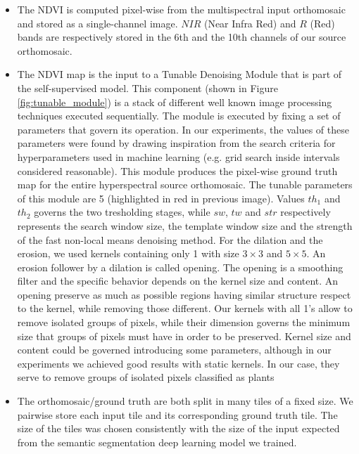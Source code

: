 \documentclass[comsoc,final]{IEEEtran}
\newcommand{\todo}[1]{\textcolor{red}{#1}}
\begin{document}
\begin{itemize}
    \item The NDVI is computed pixel-wise from the multispectral input orthomosaic and stored as a single-channel image. 
    $NIR$ (Near Infra Red) and $R$ (Red) bands are respectively stored in the 6th and the 10th channels of our source orthomosaic.
    \item The NDVI map is the input to a Tunable Denoising Module that is part of the self-supervised model. This component (shown in Figure \ref{fig:tunable_module}) is a stack of different well known image processing techniques executed sequentially. 
    The module is executed by fixing a set of parameters that govern its operation. In our experiments, the values of these parameters were found by drawing inspiration from the search criteria for hyperparameters used in machine learning (e.g. grid search inside intervals considered reasonable).
    This module produces the pixel-wise ground truth map for the entire hyperspectral source orthomosaic. The tunable parameters of this module are 5 (highlighted in red in previous image). Values $th_1$ and $th_2$ governs the two tresholding stages, while $sw$, $tw$ and $str$ respectively represents the search window size, the template window size and the strength of the fast non-local means denoising method. For the dilation and the erosion, we used kernels containing only 1 with size $3\times3$ and $5\times5$.
    An erosion follower by a dilation is called opening. The opening is a smoothing filter and the specific behavior depends on the kernel size and content. An opening preserve as much as possible regions having similar structure respect to the kernel, while removing those different. Our kernels with all 1's allow to remove isolated groups of pixels, while their dimension governs the minimum size that groups of pixels must have in order to be preserved. Kernel size and content could be governed introducing some parameters, although in our experiments we achieved good results with static kernels.
In our case, they serve to remove groups of isolated pixels classified as plants 
    \item The orthomosaic/ground truth are both split in many tiles of a fixed size. We pairwise store each input tile and its corresponding ground truth tile. The size of the tiles was chosen consistently with the size of the input expected from the semantic segmentation deep learning model we trained.
\end{itemize}
\end{document}
